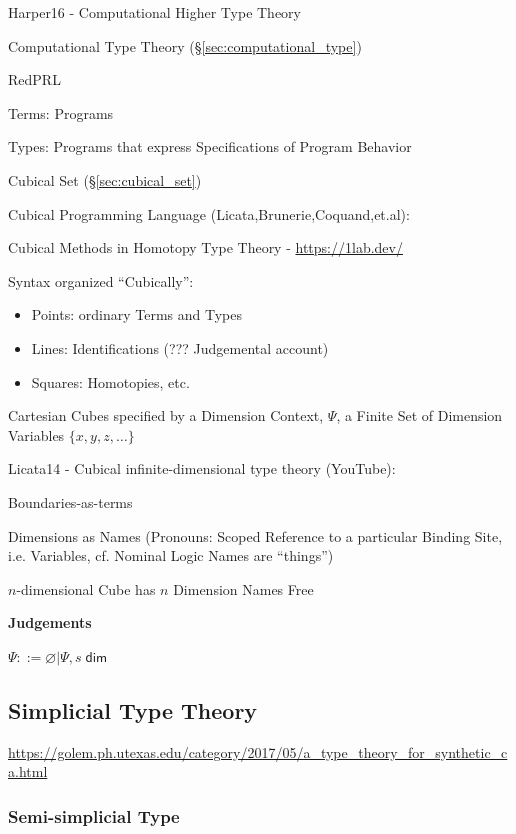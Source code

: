 Harper16 - Computational Higher Type Theory

\fist Computational Type Theory (\S\ref{sec:computational_type})

RedPRL

Terms: Programs

Types: Programs that express Specifications of Program Behavior

Cubical Set (\S\ref{sec:cubical_set})

Cubical Programming Language (Licata,Brunerie,Coquand,et.al):

Cubical Methods in Homotopy Type Theory - \url{https://1lab.dev/}

Syntax organized ``Cubically'':
\begin{itemize}
  \item Points: ordinary Terms and Types
  \item Lines: Identifications (??? Judgemental account)
  \item Squares: Homotopies, etc.
\end{itemize}

Cartesian Cubes specified by a Dimension Context, $\Psi$, a Finite Set
of Dimension Variables $\{x,y,z,\ldots\}$


Licata14 - Cubical infinite-dimensional type theory (YouTube):

Boundaries-as-terms

Dimensions as Names (Pronouns: Scoped Reference to a particular
Binding Site, i.e. Variables, cf. Nominal Logic Names are ``things'')

$n$-dimensional Cube has $n$ Dimension Names Free


\textbf{Judgements}

$\Psi ::= \varnothing | \Psi, s \;\mathsf{dim}$



\subsection{Simplicial Type Theory}\label{sec:simplicial_type_theory}

\url{https://golem.ph.utexas.edu/category/2017/05/a_type_theory_for_synthetic_ca.html}



\subsubsection{Semi-simplicial Type}\label{sec:semi_simplicial}

